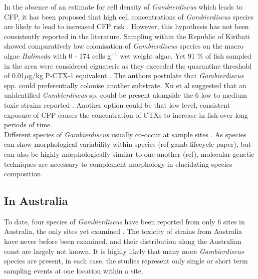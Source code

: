 \documentclass[12pt]{article}
\begin{document}


In the absence of an estimate for cell density of \emph{Gambierdiscus} which leads to CFP, it has been proposed  that high cell concentrations of \emph{Gambierdiscus} species are likely to lead to increased CFP risk \cite{litaker2010global}. 
However, this hypothesis has not been consistently reported in the literature. Sampling within the Republic of Kiribati showed comparatively low colonisation of \emph{Gambierdiscus} species on the macro algae \emph{Halimeda} with 0 - 174 cells g$^{-1}$ wet weight algae. Yet 91 \% of fish sampled in the area were considered ciguateric as they exceeded the quarantine threshold of 0.01$\mu$g/kg P-CTX-1 equivalent \cite{xu2014distribution,chan2011spatial}. The authors postulate that \emph{Gambierdiscus} spp. could preferentially colonise another substrate. Xu et al suggested that an unidentified \emph{Gambierdiscus} sp. could be present alongside the 6 low to medium toxic strains reported \cite{xu2014distribution,bomber1988r}. Another option could be that low level, consistent exposure of CFP causes the concentration of CTXs to increase in fish over long periods of time.\\

Different species of \emph{Gambierdiscus} usually co-occur at sample sites \cite{litaker2010global}. As species can show morphological variability within species (ref gamb lifecycle paper), but can also be highly morphologically similar to one another (ref), molecular genetic techniques are necessary to complement morphology in elucidating species composition.

\subsection{In Australia}
To date, four species of \emph{Gambierdiscus} have been reported from only 6 sites in Australia, the only sites yet examined \cite{kohli2014cob,murray2014molecular}. The toxicity of strains from Australia have never before been examined, and their distribution along the Australian coast are largely not known. It is highly likely that many more \emph{Gambierdiscus} species are present, in each case, the studies represent only single or short term sampling events at one location within a site.
\end{document}
